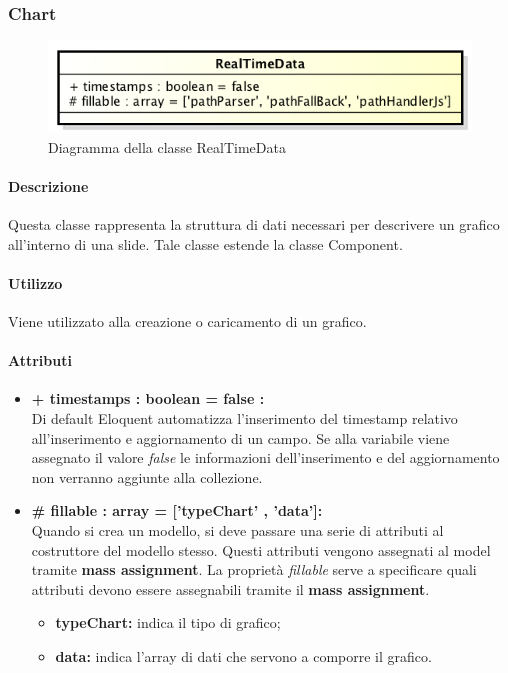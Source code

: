 \subsubsection{Chart}

	\begin{figure}[h]
		\centering
		\includegraphics[width=0.5\linewidth]{img/back_end_premi_model_realTimeData}
		\caption[Diagramma della classe RealTimeData]{Diagramma della classe RealTimeData}
		\label{fig:back_end_premi_model_chart}
	\end{figure}

	\paragraph{Descrizione}
	Questa classe rappresenta la struttura di dati necessari per descrivere un grafico all'interno di una \gls{slide}. Tale classe estende la classe Component.
	
	\paragraph{Utilizzo}
	Viene utilizzato alla creazione o caricamento di un grafico.

	\paragraph{Attributi}
	\begin{itemize}
		\item \textbf{+ timestamps : boolean = false :}\\
		Di default Eloquent automatizza l'inserimento del timestamp relativo all'inserimento e aggiornamento di un campo. Se alla variabile viene assegnato il valore \textit{false} le informazioni dell'inserimento e del aggiornamento non verranno aggiunte alla collezione.
		\item \textbf{\# fillable : array = [’typeChart’ , ’data’]:}\\
		Quando si crea un modello, si deve passare una serie di attributi al costruttore del modello stesso. Questi attributi vengono assegnati al model tramite \textbf{mass assignment}. La proprietà \textit{fillable} serve a specificare quali attributi devono essere assegnabili tramite il \textbf{mass assignment}.
		\begin{itemize}
			\item \textbf{typeChart:} indica il tipo di grafico;
			\item \textbf{data:} indica l'array di dati che servono a comporre il grafico.
		\end{itemize}
		
	\end{itemize}
\newpage


